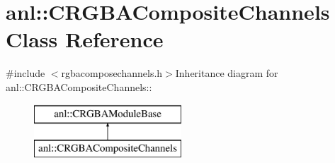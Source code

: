 \hypertarget{classanl_1_1CRGBACompositeChannels}{
\section{anl::CRGBACompositeChannels Class Reference}
\label{classanl_1_1CRGBACompositeChannels}
}


{\ttfamily \#include $<$rgbacomposechannels.h$>$}Inheritance diagram for anl::CRGBACompositeChannels::\begin{figure}[H]
\begin{center}
\leavevmode
\includegraphics[height=2cm]{classanl_1_1CRGBACompositeChannels}
\end{center}
\end{figure}
